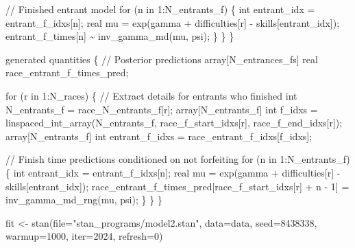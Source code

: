 \documentclass[
  letterpaper,
  DIV=11,
  numbers=noendperiod]{scrartcl}
\newenvironment{Shaded}{\begin{snugshade}}{\end{snugshade}}
\newcommand{\AttributeTok}[1]{\textcolor[rgb]{0.40,0.45,0.13}{#1}}
\newcommand{\CommentTok}[1]{\textcolor[rgb]{0.37,0.37,0.37}{#1}}
\newcommand{\ControlFlowTok}[1]{\textcolor[rgb]{0.00,0.23,0.31}{#1}}
\newcommand{\DataTypeTok}[1]{\textcolor[rgb]{0.68,0.00,0.00}{#1}}
\newcommand{\DecValTok}[1]{\textcolor[rgb]{0.68,0.00,0.00}{#1}}
\newcommand{\FunctionTok}[1]{\textcolor[rgb]{0.28,0.35,0.67}{#1}}
\newcommand{\KeywordTok}[1]{\textcolor[rgb]{0.00,0.23,0.31}{#1}}
\newcommand{\NormalTok}[1]{\textcolor[rgb]{0.00,0.23,0.31}{#1}}
\newcommand{\OtherTok}[1]{\textcolor[rgb]{0.00,0.23,0.31}{#1}}
\newcommand{\StringTok}[1]{\textcolor[rgb]{0.13,0.47,0.30}{#1}}
\begin{document}
\begin{codelisting}
\begin{Shaded}
\begin{Highlighting}[]
    \CommentTok{// Finished entrant model}
    \ControlFlowTok{for}\NormalTok{ (n }\ControlFlowTok{in} \DecValTok{1}\NormalTok{:N\_entrants\_f) \{}
      \DataTypeTok{int}\NormalTok{ entrant\_idx = entrant\_f\_idxs[n];}
      \DataTypeTok{real}\NormalTok{ mu = exp(gamma + difficulties[r] {-} skills[entrant\_idx]);}
\NormalTok{      entrant\_f\_times[n] \textasciitilde{} inv\_gamma\_md(mu, psi);}
\NormalTok{    \}}
\NormalTok{  \}}
\NormalTok{\}}

\KeywordTok{generated quantities}\NormalTok{ \{}
  \CommentTok{// Posterior predictions}
  \DataTypeTok{array}\NormalTok{[N\_entrances\_fs] }\DataTypeTok{real}\NormalTok{ race\_entrant\_f\_times\_pred;}

  \ControlFlowTok{for}\NormalTok{ (r }\ControlFlowTok{in} \DecValTok{1}\NormalTok{:N\_races) \{}
    \CommentTok{// Extract details for entrants who finished}
    \DataTypeTok{int}\NormalTok{ N\_entrants\_f = race\_N\_entrants\_f[r];}
    \DataTypeTok{array}\NormalTok{[N\_entrants\_f] }\DataTypeTok{int}\NormalTok{ f\_idxs = linspaced\_int\_array(N\_entrants\_f,}
\NormalTok{                                                         race\_f\_start\_idxs[r],}
\NormalTok{                                                         race\_f\_end\_idxs[r]);}
    \DataTypeTok{array}\NormalTok{[N\_entrants\_f] }\DataTypeTok{int}\NormalTok{ entrant\_f\_idxs = race\_entrant\_f\_idxs[f\_idxs];}

    \CommentTok{// Finish time predictions conditioned on not forfeiting}
    \ControlFlowTok{for}\NormalTok{ (n }\ControlFlowTok{in} \DecValTok{1}\NormalTok{:N\_entrants\_f) \{}
      \DataTypeTok{int}\NormalTok{ entrant\_idx = entrant\_f\_idxs[n];}
      \DataTypeTok{real}\NormalTok{ mu = exp(gamma + difficulties[r] {-} skills[entrant\_idx]);}
\NormalTok{      race\_entrant\_f\_times\_pred[race\_f\_start\_idxs[r] + n {-} }\DecValTok{1}\NormalTok{]}
\NormalTok{        = inv\_gamma\_md\_rng(mu, psi);}
\NormalTok{    \}}
\NormalTok{  \}}
\NormalTok{\}}
\end{Highlighting}
\end{Shaded}

\end{codelisting}

\begin{Shaded}
\begin{Highlighting}[]
\NormalTok{fit }\OtherTok{\textless{}{-}} \FunctionTok{stan}\NormalTok{(}\AttributeTok{file=}\StringTok{"stan\_programs/model2.stan"}\NormalTok{,}
            \AttributeTok{data=}\NormalTok{data, }\AttributeTok{seed=}\DecValTok{8438338}\NormalTok{,}
            \AttributeTok{warmup=}\DecValTok{1000}\NormalTok{, }\AttributeTok{iter=}\DecValTok{2024}\NormalTok{, }\AttributeTok{refresh=}\DecValTok{0}\NormalTok{)}
\end{Highlighting}
\end{Shaded}
\end{document}
